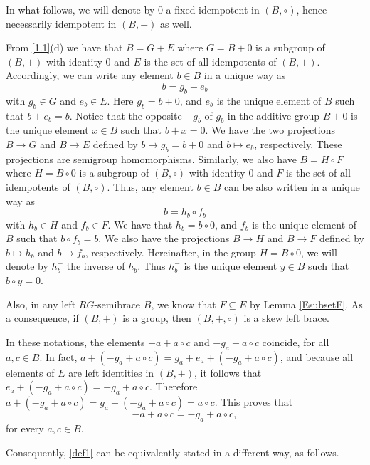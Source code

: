 \documentclass[11pt]{amsart}
\newtheorem{definition}[theorem]{Definition}
\theoremstyle{definition}
\begin{document}
\smallskip

In what follows, we will denote by $0$ a fixed idempotent in $(B,\circ)$, hence necessarily idempotent in $(B,+)$ as well.

\bigskip

From \cref{1.1}(d) we have that $B = G + E$ where $G=B+0$ is a subgroup of $(B, +)$ with identity $0$ and $E$ is the set of all idempotents of $(B,+)$. Accordingly, we can write any element $b\in B$ in a unique way as
$$
b = g_b + e_b
$$
with $g_b\in G$ and $e_b\in E$. Here $g_b=b+0$, and $e_b$ is the unique element of $B$ such that $b+e_b=b$. Notice that the opposite $-g_b$ of $g_b$ in the additive group $B+0$ is the unique element $x\in B$ such that $b+x=0$. We have the two projections $B\to G$ and $B\to E$ defined by $b\mapsto g_b=b+0$ and $b\mapsto e_b$, respectively. These projections are semigroup homomorphisms. 
Similarly, we also have $B=H \circ F$ where $H=B \circ 0$ is a subgroup of $(B, \circ)$ with identity $0$ and $F$ is the set of all idempotents of $(B,\circ)$. Thus, any element $b \in B$ can be also written in a unique way as
$$
b = h_b \circ f_b
$$
with $h_b\in H$ and $f_b\in F$. We have that $h_b=b\circ 0$, and $f_b$ is the unique element of $B$ such that $b\circ f_b=b$. We also have the projections $B\to H$ and $B\to F$ defined by $b\mapsto h_b$ and $b\mapsto f_b$, respectively. Hereinafter, in the group $H=B\circ0$, we will denote by $h_b^-$ the inverse of $h_b$. Thus $h_b^-$ is the unique element $y\in B$ such that $b\circ y=0$. 

Also, in any left $RG$-semibrace $B$, we know that $F\subseteq E$ by Lemma \ref{EsubsetF}. As a consequence, if $(B, +)$ is a group, then $(B, +, \circ)$ is a skew left brace.

\smallskip


In these notations, the elements $-a+a\circ c$ and $-g_a + a\circ c$ coincide, for all $a, c\in B$. In fact, $a+(-g_a + a\circ c) = g_a + e_a+( - g_a + a\circ c)$, and because all elements of $E$ are left identities in $(B,+)$, it follows that $e_a +( - g_a + a\circ c)= - g_a + a\circ c$. Therefore $a+(-g_a + a\circ c) = g_a + (- g_a + a\circ c) = a\circ c$. This proves that 
$$
-a+a\circ c=-g_a + a\circ c,
$$ 
for every $a,c\in B$.

\medskip

Consequently, \cref{def1} can be equivalently stated in a different way, as follows.  

\end{document}

